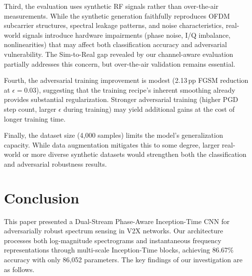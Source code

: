 \documentclass[conference]{IEEEtran}
\begin{document}
Third, the evaluation uses synthetic RF signals rather than over-the-air measurements. While the synthetic generation faithfully reproduces OFDM subcarrier structures, spectral leakage patterns, and noise characteristics, real-world signals introduce hardware impairments (phase noise, I/Q imbalance, nonlinearities) that may affect both classification accuracy and adversarial vulnerability. The Sim-to-Real gap revealed by our channel-aware evaluation partially addresses this concern, but over-the-air validation remains essential.

Fourth, the adversarial training improvement is modest (2.13\,pp FGSM reduction at $\epsilon = 0.03$), suggesting that the training recipe's inherent smoothing already provides substantial regularization. Stronger adversarial training (higher PGD step count, larger $\epsilon$ during training) may yield additional gains at the cost of longer training time.

Finally, the dataset size (4,000 samples) limits the model's generalization capacity. While data augmentation mitigates this to some degree, larger real-world or more diverse synthetic datasets would strengthen both the classification and adversarial robustness results.

\section{Conclusion}
\label{sec:conclusion}

This paper presented a Dual-Stream Phase-Aware Inception-Time CNN for adversarially robust spectrum sensing in V2X networks. Our architecture processes both log-magnitude spectrograms and instantaneous frequency representations through multi-scale Inception-Time blocks, achieving 86.67\% accuracy with only 86,052 parameters. The key findings of our investigation are as follows.
\end{document}

